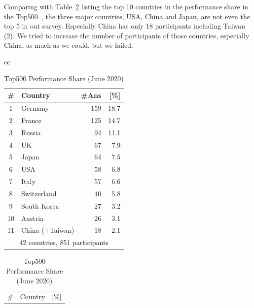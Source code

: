 \documentclass[conference,10pt,letterpaper]{IEEEtran}
\begin{document}
Comparing with Table~\ref{tab:top500-share} listing the top 10
countries in the performance share in the Top500~\cite{Top500}, the
three major countries, USA, China and Japan, are not even the top 5 in
out survey. Especially China has only 18 participants including
Taiwan (2). We tried to increase the number of participants of those
countries, especially China, as much as we could, but we failed.
%
\begin{table}[htb]%
\begin{center}%
\begin{tabular}[t]{cc}
%
\begin{minipage}[t]{0.5\hsize}
\begin{center}%
\caption{Top 11 Countries of Participants}%
\label{tab:countries}%
\begin{tabular}{c|l|r|r}%
\hline%
\# & Country & \#Ans & [\%] \\%
\hline%
1 & Germany 	& 159 & 18.7 \\%
2 & France 	& 125 & 14.7 \\%
3 & Russia 	& 94  & 11.1 \\%
4 & UK 		& 67  &  7.9 \\%
5 & Japan 	& 64  &  7.5 \\%
6 & USA 	& 58  &  6.8 \\%
7 & Italy 	& 57  &  6.6 \\%
\hline%
8 & Switzerland & 40  &  5.8 \\%
9 & South Korea & 27  &  3.2 \\%
10 & Austria 	& 26  &  3.1 \\%
11 & China (+Taiwan) & 18 & 2.1 \\%
\hline%
\multicolumn{4}{c}{42 countries, 851 participants} \\%
\end{tabular}%
\end{center}%
\end{minipage}
%
\begin{minipage}[t]{0.5\hsize}
\begin{center}%
\caption{Top500 Performance Share (June 2020)}%
\label{tab:top500-share}%
\begin{tabular}{c|l|r}%
\hline%
\# & Country & [\%] \\%

\end{tabular}
\end{center}
\end{minipage}
\end{tabular}
\end{center}
\end{table}
\end{document}
